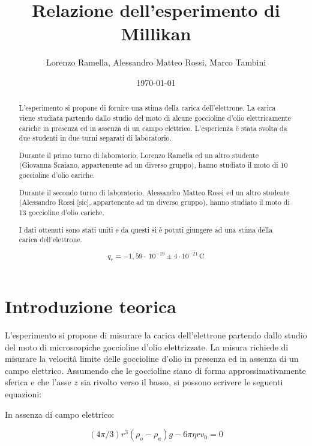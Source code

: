 \documentclass{article}
\title{Relazione dell'esperimento di Millikan}
\author{Lorenzo Ramella, Alessandro Matteo Rossi, Marco Tambini}
\date{\today}
\begin{document}
\maketitle

\begin{abstract}
L’esperimento si propone di fornire una stima della carica dell’elettrone. La carica viene studiata partendo dallo studio del moto di alcune goccioline d’olio elettricamente cariche in presenza ed in assenza di un campo elettrico. L'esperienza è stata svolta da due studenti in due turni separati di laboratorio.

\vspace{4mm}

Durante il primo turno di laboratorio, Lorenzo Ramella ed un altro studente (Giovanna Scaiano, appartenente ad un diverso gruppo), hanno studiato il moto di 10 goccioline d’olio cariche. 

\vspace{4mm}

Durante il secondo turno di laboratorio, Alessandro Matteo Rossi ed un altro studente (Alessandro Rossi [sic], appartenente ad un diverso gruppo), hanno studiato il moto di 13 goccioline d’olio cariche. 

\vspace{4mm}

I dati ottenuti sono stati uniti e da questi si è potuti giungere ad una stima della carica dell'elettrone.

\[q_e = - 1,59 \cdot\ 10^{-19} \pm 4 \cdot 10^{-21} \, \textrm{C}\]

\end{abstract}
\tableofcontents

\section{Introduzione teorica}
L'esperimento si propone di misurare la carica dell'elettrone partendo dallo studio del moto di microscopiche goccioline d'olio elettrizzate. La misura richiede di misurare la velocità limite delle goccioline d'olio in presenza ed in assenza di un campo elettrico. Assumendo che le goccioline siano di forma approssimativamente sferica e che l'asse $z$ sia rivolto verso il basso, si possono scrivere le seguenti equazioni:

In assenza di campo elettrico:

\begin{equation}
(4 \pi /3)r^3 (\rho _o - \rho _a)g - 6\pi \eta r v_0=0 
\end{equation}
\end{document}
